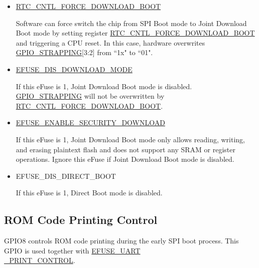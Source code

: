 \documentclass[main\_\_EN.tex]{subfiles}
\begin{document}
\begin{itemize}
    \item \hyperref[fielddesc:RTCCNTLFORCEDOWNLOADBOOT]{RTC\_CNTL\_FORCE\_DOWNLOAD\_BOOT}

    Software can force switch the chip from SPI Boot mode to Joint Download Boot mode by setting register \hyperref[fielddesc:RTCCNTLFORCEDOWNLOADBOOT]{RTC\_CNTL\_FORCE\_DOWNLOAD\_BOOT} and triggering a CPU reset. In this case, hardware overwrites \hyperref[fielddesc:GPIOSTRAPPING]{GPIO\_STRAPPING}[3:2] from ``1x" to ``01".

    \item \hyperref[fielddesc:EFUSEDISDOWNLOADMODE]{EFUSE\_DIS\_DOWNLOAD\_MODE}

    If this eFuse is 1, Joint Download Boot mode is disabled. \hyperref[fielddesc:GPIOSTRAPPING]{GPIO\_STRAPPING} will not be overwritten by \hyperref[fielddesc:RTCCNTLFORCEDOWNLOADBOOT]{RTC\_CNTL\_FORCE\_DOWNLOAD\_BOOT}.

    \item \hyperref[fielddesc:EFUSEENABLESECURITYDOWNLOAD]{EFUSE\_ENABLE\_SECURITY\_DOWNLOAD}

    If this eFuse is 1, Joint Download Boot mode only allows reading, writing, and erasing plaintext flash and does not support any SRAM or register operations. Ignore this eFuse if Joint Download Boot mode is disabled.

    \item EFUSE\_DIS\_DIRECT\_BOOT

    If this eFuse is 1, Direct Boot mode is disabled.
\end{itemize}



\subsection{ROM Code Printing Control}

GPIO8 controls ROM code printing during the early SPI boot process. This GPIO is used together with \hyperref[fielddesc:EFUSEUARTPRINTCONTROL]{EFUSE\_UART\\\_PRINT\_CONTROL}.
\end{document}
